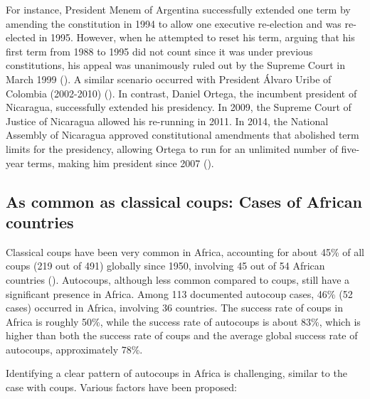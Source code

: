 \documentclass[
  12pt,
]{report}
\begin{document}
For instance, President Menem of Argentina successfully extended one
term by amending the constitution in 1994 to allow one executive
re-election and was re-elected in 1995. However, when he attempted to
reset his term, arguing that his first term from 1988 to 1995 did not
count since it was under previous constitutions, his appeal was
unanimously ruled out by the Supreme Court in March 1999
(). A similar scenario occurred
with President Álvaro Uribe of Colombia (2002-2010)
(). In contrast, Daniel Ortega,
the incumbent president of Nicaragua, successfully extended his
presidency. In 2009, the Supreme Court of Justice of Nicaragua allowed
his re-running in 2011. In 2014, the National Assembly of Nicaragua
approved constitutional amendments that abolished term limits for the
presidency, allowing Ortega to run for an unlimited number of five-year
terms, making him president since 2007 ().

\subsection{As common as classical coups: Cases of African
countries}\label{as-common-as-classical-coups-cases-of-african-countries}

Classical coups have been very common in Africa, accounting for about
45\% of all coups (219 out of 491) globally since 1950, involving 45 out
of 54 African countries (). Autocoups, although less common compared to coups, still
have a significant presence in Africa. Among 113 documented autocoup
cases, 46\% (52 cases) occurred in Africa, involving 36 countries. The
success rate of coups in Africa is roughly 50\%, while the success rate
of autocoups is about 83\%, which is higher than both the success rate
of coups and the average global success rate of autocoups, approximately
78\%.

Identifying a clear pattern of autocoups in Africa is challenging,
similar to the case with coups. Various factors have been proposed:
\end{document}
